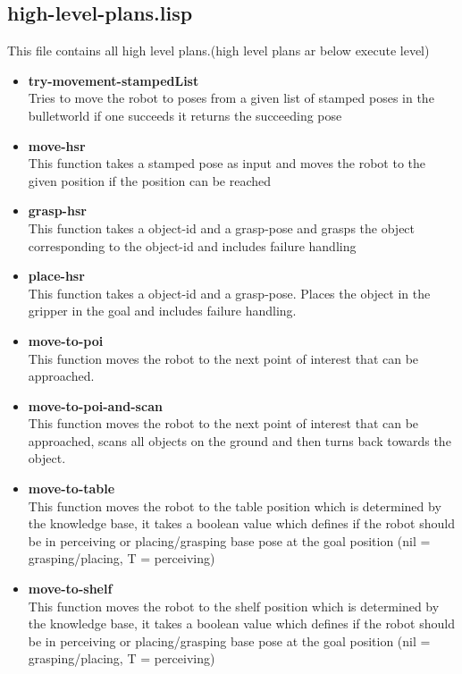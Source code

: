\documentclass[main.tex]{subfiles}
\begin{document}
	    \subsection{high-level-plans.lisp}
	    This file contains all high level plans.(high level plans ar below execute level)
	    \begin{itemize}
		\item \textbf{try-movement-stampedList} \\
		Tries to move the robot to poses from a given list of stamped poses in the bulletworld if one succeeds it returns the succeeding pose 
	    \item \textbf{move-hsr} \\
	    This function takes a stamped pose as input and moves the robot to the given position if the position can be reached
	    \item \textbf{grasp-hsr} \\
	    This function takes a object-id and a grasp-pose and grasps the object corresponding to the object-id and includes failure handling
	    \item \textbf{place-hsr} \\
	    This function takes a object-id and a grasp-pose. Places the object in the gripper in the goal and includes failure handling.
	    \item \textbf{move-to-poi} \\
	    This function moves the robot to the next point of interest that can be approached. 
	    \item \textbf{move-to-poi-and-scan} \\
	    This function moves the robot to the next point of interest that can be approached, scans all objects on the ground and then turns back towards the object.
	    \item \textbf{move-to-table} \\
	    This function moves the robot to the table position which is determined by the knowledge base, it takes a boolean value which defines if the robot should be in perceiving or placing/grasping base pose at the goal position (nil = grasping/placing, T = perceiving) 
	    \item \textbf{move-to-shelf} \\
	    This function moves the robot to the shelf position which is determined by the knowledge base, it takes a boolean value which defines if the robot should be in perceiving or placing/grasping base pose at the goal position (nil = grasping/placing, T = perceiving) 
		\end{itemize}
\end{document}
